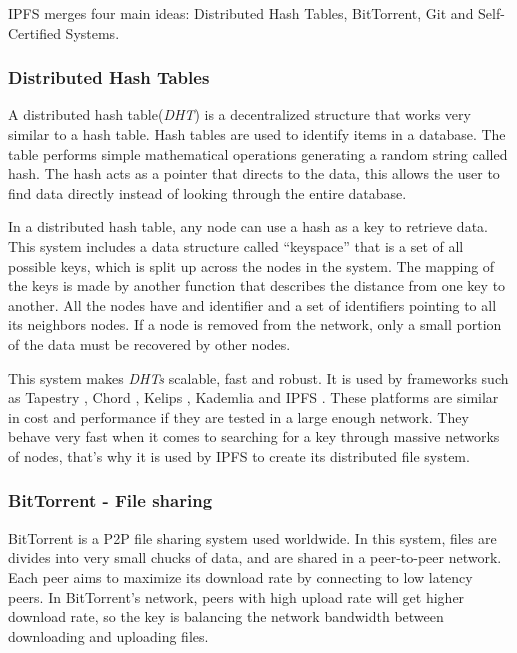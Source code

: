 IPFS merges four main ideas: Distributed Hash Tables, BitTorrent, Git and
Self-Certified Systems.

\subsubsection*{Distributed Hash Tables}
\label{tech:sec:ipfs:dht}
A distributed hash table(\emph{DHT}) is a decentralized structure that works
very similar to a hash table. Hash tables are used to identify items in a
database. The table performs simple mathematical operations generating a random
string called hash. The hash acts as a pointer that directs to the data, this
allows the user to find data directly instead of looking through the entire
database\cite{kaluszka2010distributed}.

In a distributed hash table, any node can use a hash as a key to retrieve data.
This system includes a data structure called ``keyspace'' that is a set of all
possible keys, which is split up across the nodes in the system. The mapping of
the keys is made by another function that describes the distance from one key to
another. All the nodes have and identifier and a set of identifiers pointing to
all its neighbors nodes. If a node is removed from the network, only a small
portion of the data must be recovered by other
nodes\cite{kaluszka2010distributed}.

This system makes \emph{DHTs} scalable, fast and robust. It is used by
frameworks such as Tapestry \cite{zhao2004tapestry}, Chord
\cite{stoica2001chord}, Kelips \cite{gupta2003kelips}, Kademlia
\cite{maymounkov2002kademlia} and IPFS \cite{benet2014ipfs}. These platforms are
similar in cost and performance if they are tested in a large enough network.
They behave very fast when it comes to searching for a key through massive
networks of nodes\cite{li2004comparing}, that's why it is used by IPFS to create
its distributed file system.

\subsubsection*{BitTorrent - File sharing}
\label{tech:sec:ipfs:bt}
BitTorrent \cite{cohen2003incentives} is a P2P file sharing system used
worldwide. In this system, files are divides into very small chucks of data, and
are shared in a peer-to-peer network. Each peer aims to maximize its download
rate by connecting to low latency peers. In BitTorrent's network, peers with
high upload rate will get higher download rate, so the key is balancing the
network bandwidth between downloading and uploading
files\cite{pouwelse2005bittorrent}.

